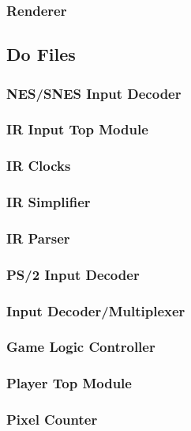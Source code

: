 \documentclass[]{article}
\begin{document}
\subsubsection{Renderer}

\subsection{Do Files}
\subsubsection{NES/SNES Input Decoder}

\subsubsection{IR Input Top Module}

\subsubsection{IR Clocks}

\subsubsection{IR Simplifier}

\subsubsection{IR Parser}

\subsubsection{PS/2 Input Decoder}

\subsubsection{Input Decoder/Multiplexer}

\subsubsection{Game Logic Controller}

\subsubsection{Player Top Module}

\subsubsection{Pixel Counter}

\end{document}
